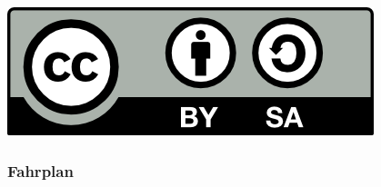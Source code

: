 \documentclass{beamer}
\title{\dctitle}
\author{\dcauthorsshort}
\date{\dcdate}
\institute{basierend auf ,,Cryptoparty an der LMU`` von Michael Weiner}
\begin{document}
\begin{frame}[plain]
    \titlepage

\vfill
\begin{flushright}
\href{https://creativecommons.org/licenses/by-sa/4.0/}{\includegraphics[height=3ex]{images/by-sa.png}}
\end{flushright}
\end{frame}

\begin{frame}
\frametitle{Fahrplan}
\tableofcontents[hidesubsections]
\end{frame}


\end{document}
